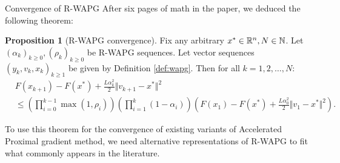 \documentclass[11pt]{beamer}
\theoremstyle{definition}
\newtheorem{proposition}{Proposition}[section]
\begin{document}
    \begin{frame}{Convergence of R-WAPG}
        After six pages of math in the paper, we deduced the following theorem: 
        \begin{proposition}[R-WAPG convergence]\label{prop:wapg-convergence}
            Fix any arbitrary $x^* \in \mathbb R^n, N \in \mathbb N$.
            Let $(\alpha_k)_{k \ge 0}, (\rho_k)_{k \ge 0}$ be R-WAPG sequences.
            Let vector sequences $(y_k, v_{k}, x_{k})_{k \ge 1}$ be given by Definition \ref{def:wapg}. 
            Then for all $k = 1, 2, \ldots, N$:
            {\small
            \begin{align*}
                & F(x_{k + 1}) - F(x^*) + \frac{L \alpha_k^2}{2}\Vert v_{k + 1} - x^*\Vert^2
                \\
                &\le
                \left(
                    \prod_{i = 0}^{k - 1} \max(1, \rho_{i})
                \right)
                \left(
                    \prod_{i = 1}^{k} \left(1  - \alpha_i\right)
                \right)
                \left(
                    F(x_1) - F(x^*) + \frac{L\alpha_0^2}{2}\Vert v_1 - x^*\Vert^2
                \right).
            \end{align*}
            }
        \end{proposition}
        To use this theorem for the convergence of existing variants of Accelerated Proximal gradient method, we need alternative representations of R-WAPG to fit what commonly appears in the literature. 
    \end{frame}
\end{document}
